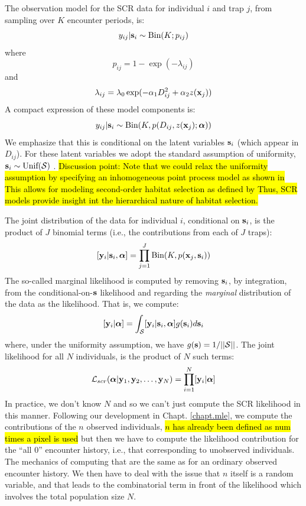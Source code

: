 The observation model for the SCR data for individual $i$ and trap $j$,
from sampling over $K$ encounter periods, is:
\[
 y_{ij}|{\bf s}_{i} \sim \mbox{Bin}(K; p_{ij})
\]
where
\[
 p_{ij} = 1-\exp(- \lambda_{ij} )
\]
and
\[
 \lambda_{ij} = \lambda_{0} \exp(- \alpha_{1} D_{ij}^{2} + \alpha_{2}
 z({\bf x}_{j}) )
\]
A compact expression of these model components is:
\begin{equation}
y_{ij}| {\bf s}_{i} \sim \mbox{Bin}(K, p(D_{ij}, z({\bf x}_{j}); {\bm \alpha}))
\label{rsf.mle.eq.cond-on-s}
\end{equation}
We emphasize that this is conditional on the latent variables ${\bf
  s}_{i}$ (which appear in $D_{ij}$). For these latent variables we
adopt the standard assumption of uniformity, ${\bf s}_{i} \sim
\mbox{Unif}({\cal S})$ \citep{royle_young:2008}.
\hl{Discussion point: Note that we could
relax the uniformity assumption by specifying an inhomogeneous point
process model %
as shown in
This allows for modeling second-order habitat
selection as defined by %
Thus, SCR models
provide insight int the hierarchical nature of habitat selection.}

The joint distribution of the data for
individual $i$, conditional on ${\bf s}_{i}$, is the product of $J$
binomial terms (i.e., the contributions from each of $J$ traps):
\[
  [{\bf y}_{i} | {\bf s}_{i} , {\bm \alpha}] =
  \prod_{j=1}^{J} \mbox{Bin}(K, p({\bf x}_{j},{\bf s}_{i}) )
\]
The so-called marginal likelihood \citep{borchers_efford:2008} is
computed by removing ${\bf s}_{i}$, by integration, from the
conditional-on-${\bf s}$ likelihood and regarding the {\it marginal}
distribution of the data as the likelihood. That is, we compute:
\[
  [{\bf y}_{i}|{\bm \alpha}] =
\int_{{\cal S}}  [ {\bf y}_{i} |{\bf s}_{i},{\bm \alpha}] g({\bf s}_{i}) d{\bf s}_{i}
\]
{\flushleft where}, under the uniformity assumption, we have
$g({\bf s}) = 1/||{\cal S}||$.
The joint likelihood for all $N$ individuals,
is the product of $N$ such terms:
\[
{\cal L}_{scr}({\bm \alpha} | {\bf y}_{1},{\bf y}_{2},\ldots, {\bf y}_{N}) = \prod_{i=1}^{N}
[{\bf y}_{i}|{\bm \alpha}]
\]
In practice, we don't know $N$ and so we can't just compute the
SCR likelihood in this manner. Following our development in
Chapt. \ref{chapt.mle},
we compute the contributions of the
$n$ observed individuals,
\hl{$n$ has already been defined as num times a pixel is used}
but then we have to compute the likelihood
contribution for the ``all 0'' encounter history, i.e., that
corresponding to unobserved individuals. The mechanics of computing
that are the same as for an ordinary observed encounter history. We
then have to deal with the issue that $n$ itself is a random variable,
and that leads to the combinatorial term in front of the likelihood
which involves the total population size $N$.

